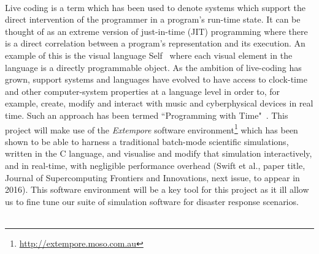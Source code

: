 \documentclass[a4paper,fontsize=13pt]{scrartcl}
\begin{document}
\\


Live coding is a term which has been used to denote systems which
support the direct intervention of the programmer in a program's
run-time state. It can be thought of as an extreme version of
just-in-time (JIT) programming where there is a direct correlation
between a program's representation and its execution. An example of
this is the visual language Self~\parencite{ungar_self_1987} where
each visual element in the language is a directly programmable object.
As the ambition of live-coding has grown, support systems and
languages have evolved to have access to clock-time and other
computer-system properties at a language level in order to, for
example, create, modify and interact with music and cyberphysical
devices in real time. Such an approach has been termed ``Programming
with Time"~\parencite{sorensen2010programming}. This project will make
use of the \emph{Extempore} software
environment\footnote{\url{http://extempore.moso.com.au}} which has been shown to be able to harness  a traditional batch-mode scientific simulations, written in the C language, and visualise and modify that simulation interactively, and in real-time, with negligible performance overhead (Swift et al., paper title, Journal of Supercomputing Frontiers and Innovations, next issue, to appear in 2016). This software environment will be a key tool for this project as it ill allow us to fine tune our suite of simulation software for disaster response scenarios.\\



\\



\end{document}
